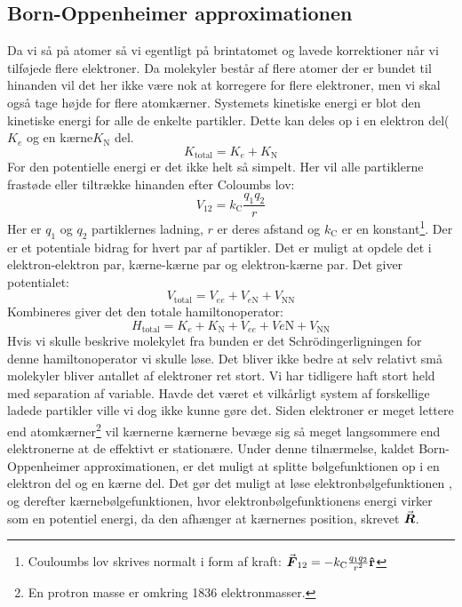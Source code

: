 \documentclass[../../Atom-ogMolekylefysik.tex]{subfiles}
\begin{document}
\subsection{Born-Oppenheimer approximationen}
Da vi så på atomer så vi egentligt på brintatomet og lavede korrektioner når vi tilføjede flere elektroner. Da molekyler består af flere atomer der er bundet til hinanden vil det her ikke være nok at korregere for flere elektroner, men vi skal også tage højde for flere atomkærner. Systemets kinetiske energi er blot den kinetiske energi for alle de enkelte partikler. Dette kan deles op i en elektron del($K_e$ og en kærne$K_\text{N}$ del.
\begin{equation}
    K_\text{total} = K_e+K_\text{N}
\end{equation}
For den potentielle energi er det ikke helt så simpelt. Her vil alle partiklerne  frastøde eller tiltrække hinanden efter Coloumbs lov:
\begin{equation}
    V_{12}=k_\text{C}\frac{q_1q_2}{r}
\end{equation}
Her er $q_1$ og $q_2$ partiklernes ladning, $r$ er deres afstand og $k_\text{C}$ er en konstant\footnote{Couloumbs lov skrives normalt i form af kraft:
$
{\vec{\boldsymbol{F}}}_{12} = -k_\text{C}\frac{q_1q_2}{r^2}\mathbf{\hat{r}}
$
}.
Der er et potentiale bidrag for hvert par af partikler. Det er muligt at opdele det i elektron-elektron par, kærne-kærne par og elektron-kærne par. Det giver potentialet:
\begin{equation}
    V_\text{total} = V_{ee}+V_{e\text{N}}+V_\text{NN}
\end{equation}
Kombineres giver det den totale hamiltonoperator:
\begin{equation}
    H_\text{total} = K_e + K_\text{N}+V_{ee}+V{e\text{N}}+V_\text{NN}
\end{equation}
Hvis vi skulle beskrive molekylet fra bunden er det Schrödingerligningen for denne hamiltonoperator vi skulle løse. Det bliver ikke bedre at selv relativt små molekyler bliver antallet af elektroner ret stort. Vi har tidligere haft stort held med separation af variable. Havde det været et vilkårligt system af forskellige ladede partikler ville vi dog ikke kunne gøre det. Siden elektroner er meget lettere end atomkærner\footnote{En protron masse er omkring 1836 elektronmasser.} vil kærnerne kærnerne bevæge sig så meget langsommere end elektronerne at de effektivt er stationære. Under denne tilnærmelse, kaldet Born-Oppenheimer approximationen, er det muligt at splitte bølgefunktionen op i en elektron del og en kærne del. Det gør det muligt at løse elektronbølgefunktionen , og derefter kærnebølgefunktionen, hvor elektronbølgefunktionens energi virker som en potentiel energi, da den afhænger at kærnernes position, skrevet ${\vec{\boldsymbol{R}}}$.
\end{document}

